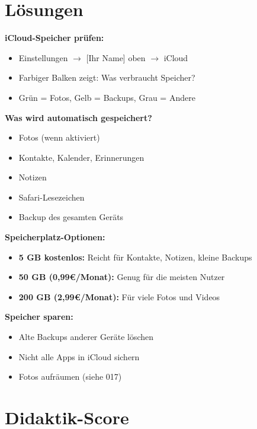 \documentclass[11pt,a4paper]{article}
\begin{document}
\section{Lösungen}

\textbf{iCloud-Speicher prüfen:}
\begin{itemize}
    \item Einstellungen $\rightarrow$ [Ihr Name] oben $\rightarrow$ iCloud
    \item Farbiger Balken zeigt: Was verbraucht Speicher?
    \item Grün = Fotos, Gelb = Backups, Grau = Andere
\end{itemize}

\textbf{Was wird automatisch gespeichert?}
\begin{itemize}
    \item Fotos (wenn aktiviert)
    \item Kontakte, Kalender, Erinnerungen
    \item Notizen
    \item Safari-Lesezeichen
    \item Backup des gesamten Geräts
\end{itemize}

\textbf{Speicherplatz-Optionen:}
\begin{itemize}
    \item \textbf{5 GB kostenlos:} Reicht für Kontakte, Notizen, kleine Backups
    \item \textbf{50 GB (0,99\euro/Monat):} Genug für die meisten Nutzer
    \item \textbf{200 GB (2,99\euro/Monat):} Für viele Fotos und Videos
\end{itemize}

\textbf{Speicher sparen:}
\begin{itemize}
    \item Alte Backups anderer Geräte löschen
    \item Nicht alle Apps in iCloud sichern
    \item Fotos aufräumen (siehe 017)
\end{itemize}

\section{Didaktik-Score}
\end{document}
